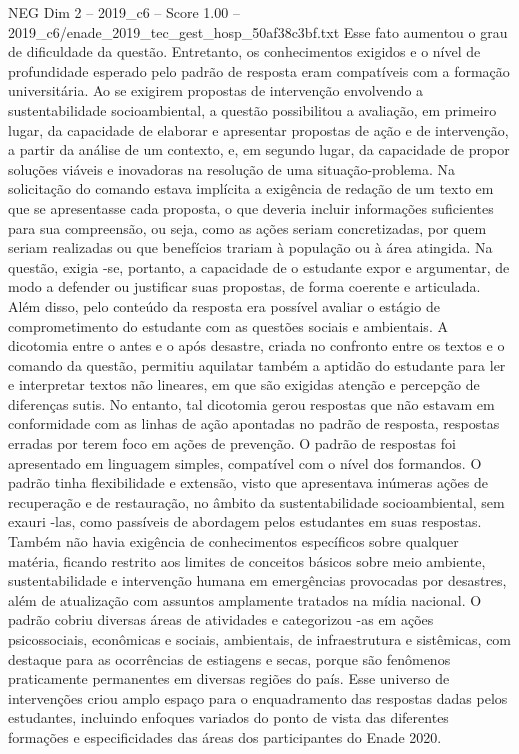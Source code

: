 \begin{textsample}{NEG Dim 2 – 2019\_c6 – Score 1.00 – 2019\_c6/enade\_2019\_tec\_gest\_hosp\_50af38c3bf.txt}
Esse fato aumentou o grau de dificuldade da questão.
Entretanto, os conhecimentos exigidos e o nível de profundidade esperado pelo padrão de resposta eram compatíveis com a formação universitária.
Ao se exigirem propostas de intervenção envolvendo a sustentabilidade socioambiental, a questão possibilitou a avaliação, em primeiro lugar, da capacidade de elaborar e apresentar propostas de ação e de intervenção, a partir da análise de um contexto, e, em segundo lugar, da capacidade de propor soluções viáveis e inovadoras na resolução de uma situação-problema.
Na solicitação do comando estava implícita a exigência de redação de um texto em que se apresentasse cada proposta, o que deveria incluir informações suficientes para sua compreensão, ou seja, como as ações seriam concretizadas, por quem seriam realizadas ou que benefícios trariam à população ou à área atingida.
Na questão, exigia -se, portanto, a capacidade de o estudante expor e argumentar, de modo a defender ou justificar suas propostas, de forma coerente e articulada.
Além disso, pelo conteúdo da resposta era possível avaliar o estágio de comprometimento do estudante com as questões sociais e ambientais.
A dicotomia entre o antes e o após desastre, criada no confronto entre os textos e o comando da questão, permitiu aquilatar também a aptidão do estudante para ler e interpretar textos não lineares, em que são exigidas atenção e percepção de diferenças sutis.
No entanto, tal dicotomia gerou respostas que não estavam em conformidade com as linhas de ação apontadas no padrão de resposta, respostas erradas por terem foco em ações de prevenção.
O padrão de respostas foi apresentado em linguagem simples, compatível com o nível dos formandos.
O padrão tinha flexibilidade e extensão, visto que apresentava inúmeras ações de recuperação e de restauração, no âmbito da sustentabilidade socioambiental, sem exauri -las, como passíveis de abordagem pelos estudantes em suas respostas.
Também não havia exigência de conhecimentos específicos sobre qualquer matéria, ficando restrito aos limites de conceitos básicos sobre meio ambiente, sustentabilidade e intervenção humana em emergências provocadas por desastres, além de atualização com assuntos amplamente tratados na mídia nacional.
O padrão cobriu diversas áreas de atividades e categorizou -as em ações psicossociais, econômicas e sociais, ambientais, de infraestrutura e sistêmicas, com destaque para as ocorrências de estiagens e secas, porque são fenômenos praticamente permanentes em diversas regiões do país.
Esse universo de intervenções criou amplo espaço para o enquadramento das respostas dadas pelos estudantes, incluindo enfoques variados do ponto de vista das diferentes formações e especificidades das áreas dos participantes do Enade 2020.

\end{textsample}
